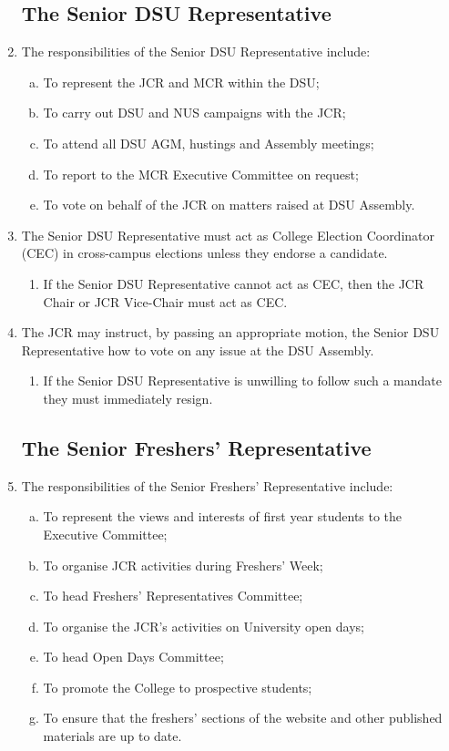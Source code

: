 \documentclass[12pt]{article}  %
\begin{document}
\begin{enumerate}
    \subsection{The Senior DSU Representative}
    \item The responsibilities of the Senior DSU Representative include:
    \begin{enumerate}[(a)]
        \item To represent the JCR and MCR within the DSU;
        \item To carry out DSU and NUS campaigns with the JCR;
        \item To attend all DSU AGM, hustings and Assembly meetings;
        \item To report to the MCR Executive Committee on request;
        \item To vote on behalf of the JCR on matters raised at DSU Assembly.
    \end{enumerate}
    \item The Senior DSU Representative must act as College Election Coordinator (CEC) in cross-campus elections unless they endorse a candidate.
    \begin{enumerate}
        \item If the Senior DSU Representative cannot act as CEC, then the JCR Chair or JCR Vice-Chair must act as CEC.
    \end{enumerate}
    \item The JCR may instruct, by passing an appropriate motion, the Senior DSU Representative how to vote on any issue at the DSU Assembly.
    \begin{enumerate}
        \item If the Senior DSU Representative is unwilling to follow such a mandate they must immediately resign.
    \end{enumerate}
    \subsection{The Senior Freshers’ Representative}
    \item The responsibilities of the Senior Freshers' Representative include:
    \begin{enumerate}[(a)]
        \item To represent the views and interests of first year students to the Executive Committee;
        \item To organise JCR activities during Freshers’ Week;
        \item To head Freshers’ Representatives Committee;
        \item To organise the JCR’s activities on University open days;
        \item To head Open Days Committee;
        \item To promote the College to prospective students;
        \item To ensure that the freshers’ sections of the website and other published materials are up to date.
    \end{enumerate}

\end{enumerate}
\end{document}
